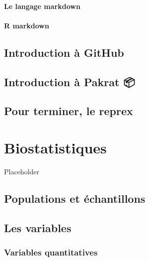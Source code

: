 \documentclass[]{book}
\begin{document}
\hypertarget{le-langage-markdown}{%
\subsubsection{Le langage markdown}\label{le-langage-markdown}}

\hypertarget{r-markdown}{%
\subsubsection{R markdown}\label{r-markdown}}

\hypertarget{introduction-uxe0-github}{%
\section{Introduction à GitHub}\label{introduction-uxe0-github}}

\hypertarget{introduction-uxe0-pakrat}{%
\section{Introduction à Pakrat 📦🐀}\label{introduction-uxe0-pakrat}}

\hypertarget{pour-terminer-le-reprex}{%
\section{\texorpdfstring{Pour terminer, le
\textbf{reprex}}{Pour terminer, le reprex}}\label{pour-terminer-le-reprex}}

\hypertarget{chapitre-biostats}{%
\chapter{Biostatistiques}\label{chapitre-biostats}}

Placeholder

\hypertarget{populations-et-uxe9chantillons}{%
\section{Populations et
échantillons}\label{populations-et-uxe9chantillons}}

\hypertarget{les-variables}{%
\section{Les variables}\label{les-variables}}

\hypertarget{variables-quantitatives}{%
\subsection{Variables quantitatives}\label{variables-quantitatives}}
\end{document}
